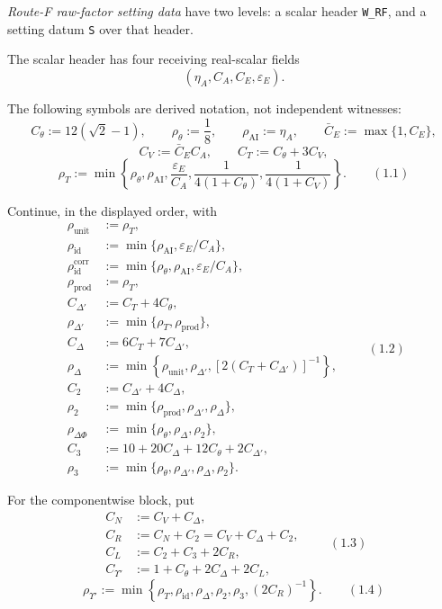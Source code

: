 \hypertarget{def:routef-raw-factor-setting}{}%
\begin{definition}\label{def:routef-raw-factor-setting}
\emph{Route-F raw-factor setting
data} have two levels: a scalar header \texttt{W\_RF}, and a setting datum \texttt{S} over
that header.

The scalar header has four receiving real-scalar fields
\[
(\eta_A,C_A,C_E,\varepsilon_E).
\]

The following symbols are derived notation, not independent witnesses:
\[
C_\theta:=12(\sqrt2-1),\qquad
\rho_\theta:=\frac18,\qquad
\rho_{\mathrm{AI}}:=\eta_A,\qquad
\bar C_E:=\max\{1,C_E\},
\]
\[
C_V:=\bar C_EC_A,\qquad C_T:=C_\theta+3C_V,
\]
\[
\rho_T:=\min\left\{
\rho_\theta,\rho_{\mathrm{AI}},\frac{\varepsilon_E}{C_A},
\frac1{4(1+C_\theta)},\frac1{4(1+C_V)}
\right\}.
\qquad (1.1)
\]

Continue, in the displayed order, with
\[
\begin{aligned}
\rho_{\mathrm{unit}}&:=\rho_T,\\
\rho_{\mathrm{id}}&:=\min\{\rho_{\mathrm{AI}},\varepsilon_E/C_A\},\\
\rho_{\mathrm{id}}^{\mathrm{corr}}
&:=\min\{\rho_\theta,\rho_{\mathrm{AI}},\varepsilon_E/C_A\},\\
\rho_{\mathrm{prod}}&:=\rho_T,\\
C_{\Delta'}&:=C_T+4C_\theta,\\
\rho_{\Delta'}&:=\min\{\rho_T,\rho_{\mathrm{prod}}\},\\
C_\Delta&:=6C_T+7C_{\Delta'},\\
\rho_\Delta&:=\min\left\{
\rho_{\mathrm{unit}},\rho_{\Delta'},[2(C_T+C_{\Delta'})]^{-1}
\right\},\\
C_2&:=C_{\Delta'}+4C_\Delta,\\
\rho_2&:=\min\{\rho_{\mathrm{prod}},\rho_{\Delta'},\rho_\Delta\},\\
\rho_{\Delta\Phi}&:=\min\{\rho_\theta,\rho_\Delta,\rho_2\},\\
C_3&:=10+20C_\Delta+12C_\theta+2C_{\Delta'},\\
\rho_3&:=\min\{\rho_\theta,\rho_{\Delta'},\rho_\Delta,\rho_2\}.
\end{aligned}
\qquad (1.2)
\]

For the componentwise block, put
\[
\begin{aligned}
C_N&:=C_V+C_\Delta,\\
C_R&:=C_N+C_2=C_V+C_\Delta+C_2,\\
C_L&:=C_2+C_3+2C_R,\\
C_{\Upsilon'}&:=1+C_\theta+2C_\Delta+2C_L,
\end{aligned}
\qquad (1.3)
\]
\[
\rho_{\Upsilon'}:=\min\left\{
\rho_T,\rho_{\mathrm{id}},\rho_\Delta,\rho_2,\rho_3,(2C_R)^{-1}
\right\}.
\qquad (1.4)
\]


\end{definition}
